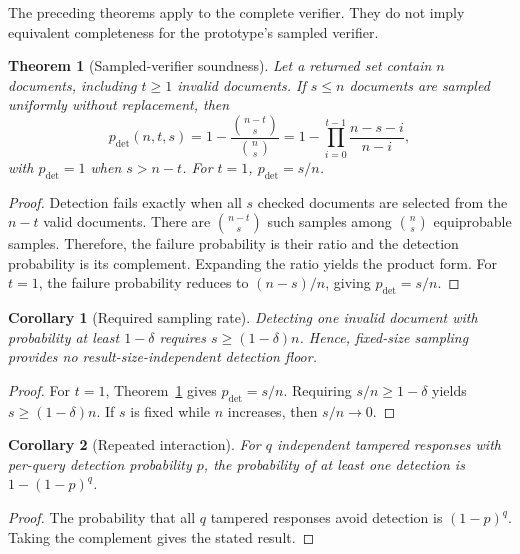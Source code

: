 \documentclass[journal]{IEEEtran}
\theoremstyle{tight}
\newtheorem{corollary}{Corollary}
\newtheorem{theorem}{Theorem}
\theoremstyle{remark}
\theoremstyle{plain}
\begin{document}
The preceding theorems apply to the complete verifier. They do not imply equivalent completeness for the prototype's sampled verifier.

\begin{theorem}[Sampled-verifier soundness]
\label{thm:sampled}
Let a returned set contain \(n\) documents, including \(t\geq1\) invalid documents. If \(s\leq n\) documents are sampled uniformly without replacement, then
\begin{equation}
p_{\det}(n,t,s)
=1-\frac{\binom{n-t}{s}}{\binom{n}{s}}
=1-\prod_{i=0}^{t-1}\frac{n-s-i}{n-i},
\label{eq:pdetect}
\end{equation}
with \(p_{\det}=1\) when \(s>n-t\). For \(t=1\),
\(p_{\det}=s/n\).
\end{theorem}

\begin{proof}
Detection fails exactly when all \(s\) checked documents are selected from the \(n-t\) valid documents. There are \(\binom{n-t}{s}\) such samples among \(\binom{n}{s}\) equiprobable samples. Therefore, the failure probability is their ratio and the detection probability is its complement. Expanding the ratio yields the product form. For \(t=1\), the failure probability reduces to \((n-s)/n\), giving \(p_{\det}=s/n\).
\end{proof}

\begin{corollary}[Required sampling rate]
\label{cor:floor}
Detecting one invalid document with probability at least \(1-\delta\) requires \(s\geq(1-\delta)n\). Hence, fixed-size sampling provides no result-size-independent detection floor.
\end{corollary}

\begin{proof}
For \(t=1\), Theorem~\ref{thm:sampled} gives \(p_{\det}=s/n\). Requiring \(s/n\geq1-\delta\) yields \(s\geq(1-\delta)n\). If \(s\) is fixed while \(n\) increases, then \(s/n\rightarrow0\).
\end{proof}

\begin{corollary}[Repeated interaction]
\label{cor:compound}
For \(q\) independent tampered responses with per-query detection probability \(p\), the probability of at least one detection is \(1-(1-p)^q\).
\end{corollary}

\begin{proof}
The probability that all \(q\) tampered responses avoid detection is \((1-p)^q\). Taking the complement gives the stated result.
\end{proof}
\end{document}
